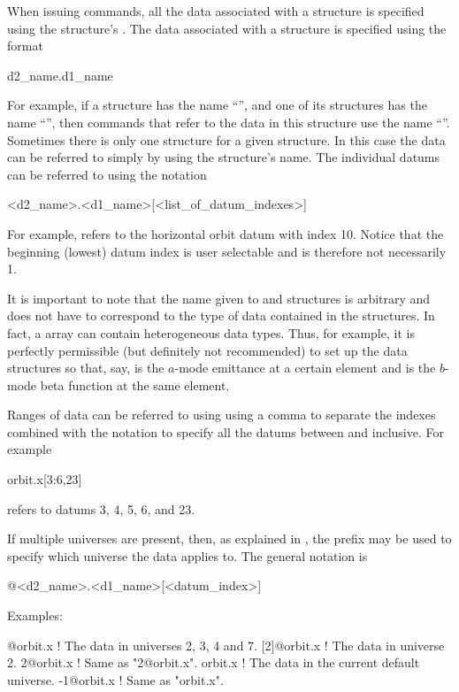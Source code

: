 When issuing \tao commands, all the
data associated with a  structure is specified using the
 structure's .  The data associated with a
 structure is specified using the format
\begin{example}
  d2_name.d1_name
\end{example}
For example, if a  structure has the
name ``'', and one of its  structures has the
name ``'', then \tao commands that refer to the data in this
 structure use the name ``''. Sometimes there
is only one  structure for a given 
structure. In this case the data can be referred to simply by using
the  structure's name. The individual datums can be
referred to using the notation
\begin{example}
  <d2_name>.<d1_name>[<list_of_datum_indexes>]
\end{example}
For example,  refers to the horizontal orbit datum
with index 10. Notice that the beginning (lowest) datum index is user
selectable and is therefore not necessarily 1. 

It is important to note that the name given to  and 
structures is arbitrary and does not have to correspond to the 
type of data contained in the 
structures. In fact, a  array can contain heterogeneous data types.
Thus, for example, it is perfectly permissible (but definitely not recommended) 
to set up the data structures so that, say,  
is the $a$-mode emittance at a certain element and 
is the $b$-mode beta function at the same element.

Ranges of data can be referred to using using a comma \vn{,} to
separate the indexes combined with the notation  to specify
all the datums between  and  inclusive. For example
\begin{example}
  orbit.x[3:6,23]
\end{example}
refers to datums 3, 4, 5, 6, and 23. 

If multiple universes are present, then, as explained in
, the prefix  may be used to specify which
universe the data applies to. The general notation is
\begin{example}
  @<d2_name>.<d1_name>[<datum_index>]
\end{example}
Examples:
\begin{example}
  [2:4,7]@orbit.x ! The  data in universes 2, 3, 4 and 7.
  [2]@orbit.x     ! The  data in universe 2. 
  2@orbit.x       ! Same as "2@orbit.x".
  orbit.x         ! The  data in the current default universe.
  -1@orbit.x      ! Same as "orbit.x".
\end{example}

